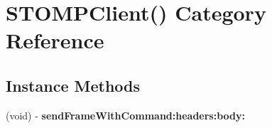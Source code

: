 \hypertarget{category_s_t_o_m_p_client_07_08}{}\section{S\+T\+O\+M\+P\+Client() Category Reference}
\label{category_s_t_o_m_p_client_07_08}
\subsection*{Instance Methods}
\begin{DoxyCompactItemize}
\item 
(void) -\/ {\bfseries send\+Frame\+With\+Command\+:headers\+:body\+:}\hypertarget{category_s_t_o_m_p_client_07_08_aabfd81454437a3975bfa00fab7b44d38}{}\label{category_s_t_o_m_p_client_07_08_aabfd81454437a3975bfa00fab7b44d38}

\end{DoxyCompactItemize}
